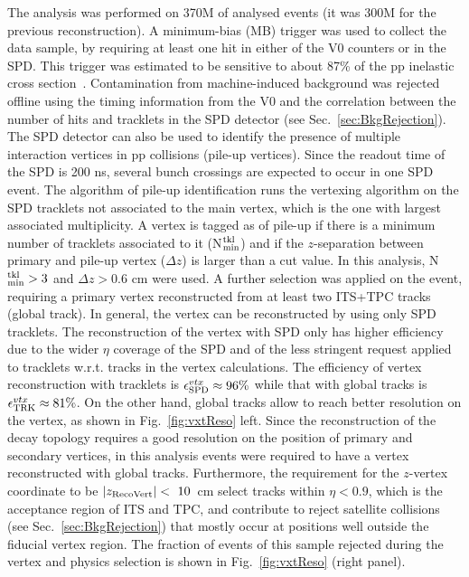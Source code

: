 The analysis was performed on 370M of analysed events (it was 300M for the previous
reconstruction).
 A minimum-bias (MB)
trigger was used to collect the data sample, by requiring
at least one hit in either of the V0 counters or in the SPD.
This trigger was estimated to be sensitive to about 87\% of the pp inelastic
cross section~\cite{Gagliardi:2011he}. 
 Contamination from machine-induced background was rejected 
 offline using the timing information from the V0 and the correlation 
 between the number of hits and tracklets in the SPD
detector (see Sec.~\ref{sec:BkgRejection}).
 The SPD detector can also be used to identify the presence of multiple interaction
vertices in pp collisions (pile-up vertices). Since the readout time of the SPD is
200 ns, several bunch crossings are expected to occur in one SPD event.
The algorithm of pile-up identification runs the vertexing algorithm 
on the SPD tracklets not associated to the
main vertex, which is the one with largest associated multiplicity. 
A vertex is tagged as of pile-up if there is a minimum number of 
tracklets associated to it (N$^{\rm tkl}_{\rm min}$) and if the 
$z$-separation between primary and pile-up vertex ($\Delta z$) is larger than a cut value.
In this analysis, N$^{\rm tkl}_{\rm min}>3$ and $\Delta z>0.6$ cm were used.
A further selection was applied on the event, requiring a primary vertex 
reconstructed from at least two ITS+TPC tracks (global track). In general, the vertex can be reconstructed by
using only SPD tracklets. The reconstruction of the vertex 
with SPD only has higher efficiency due to the wider $\eta$
coverage of the SPD and of the less stringent request applied to tracklets w.r.t. tracks in
the vertex calculations. The efficiency of vertex reconstruction with 
tracklets is $\epsilon^{vtx}_{\rm SPD} \approx 96\%$ while that with global tracks
is $\epsilon^{vtx}_{\rm TRK} \approx 81\%$. On the other hand, global tracks
allow to reach better resolution on the vertex, as shown in Fig.~\ref{fig:vxtReso} left.
Since the reconstruction of the decay topology 
requires a good resolution on the position of primary and secondary vertices,
in this analysis events were required to have a vertex reconstructed with global tracks.
Furthermore, the requirement for the $z$-vertex coordinate to be $|z_{\rm RecoVert}|<~10$~cm 
select tracks within $\eta < 0.9$, which is the acceptance region of ITS and TPC,
and contribute to reject satellite collisions (see Sec.~\ref{sec:BkgRejection}) 
that mostly occur at positions well outside the fiducial vertex region. 
The fraction of events of this sample rejected during the vertex and physics selection
is shown in Fig.~\ref{fig:vxtReso} (right panel). 

